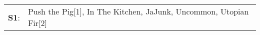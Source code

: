 \begin{supertabular}{p{0.03\textwidth}p{0.92\textwidth}}
 \textbf{S1}:  &  Push the Pig[1]\textsuperscript{}, \enspace In The Kitchen\textsuperscript{}, \enspace JaJunk\textsuperscript{}, \enspace Uncommon\textsuperscript{}, \enspace Utopian Fir[2]\textsuperscript{}  \enspace  \\
\end{supertabular}
